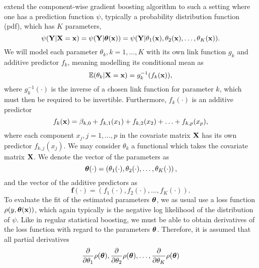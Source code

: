 \citet{schmid} extend the component-wise gradient boosting algorithm \citep{friedman2001} to such a setting where one has a prediction function $\psi$, typically a probability distribution function (pdf), which has $K$ parameters,
\begin{equation}
    \psi(\mathbf{Y}|\mathbf{X}=\mathbf{x})=\psi(\mathbf{Y}|\boldsymbol{\theta}(\mathbf{x}))=\psi(\mathbf{Y}|\theta_1(\mathbf{x}),\theta_2(\mathbf{x}),\ldots,\theta_K(\mathbf{x})).
\end{equation}
We will model each parameter $\theta_k,k=1,\ldots,K$ with its own link function $g_k$ and additive predictor $f_k$, meaning modelling its conditional mean as
\begin{equation}
    \mathbb{E}(\theta_k|\mathbf{X}=\mathbf{x})=g_k^{-1}(f_k(\mathbf{x})),
\end{equation}
where $g_k^{-1}(\cdot)$ is the inverse of a chosen link function for parameter $k$, which must then be required to be invertible. Furthermore, $f_k(\cdot)$ is an additive predictor
\begin{equation}
    f_k(\mathbf{x})=\beta_{k,0}+f_{k,1}(x_1)+f_{k,2}(x_2)+\ldots+f_{k,p}(x_p),
\end{equation}
where each component $x_j,j=1,\ldots,p$ in the covariate matrix $\mathbf{X}$ has its own predictor $f_{k,j}(x_j)$.
We may consider $\theta_k$ a functional which takes the covariate matrix $\mathbf{X}$. We denote the vector of the parameters as
\begin{equation}
    \boldsymbol{\theta}(\cdot)=\left(\theta_1(\cdot),\theta_2(\cdot),\ldots,\theta_K(\cdot)\right),
\end{equation}
and the vector of the additive predictors as
\begin{equation}
    \mathbf{f}(\cdot)=\left(f_1(\cdot),f_2(\cdot),\ldots,f_K(\cdot)\right).
\end{equation}
To evaluate the fit of the estimated parameters $\boldsymbol{\theta}$, we as usual use a loss function $\rho(y,\boldsymbol{\theta}(\mathbf{x}))$, which again typically is the negative log likelihood of the distribution of $\psi$. Like in regular statistical boosting, we must be able to obtain derivatives of the loss function with regard to the parameters $\boldsymbol{\theta}$. Therefore, it is assumed that all partial derivatives
\begin{equation}
    \frac{\partial}{\partial\theta_1}\rho(\boldsymbol{\theta}),\frac{\partial}{\partial\theta_2}\rho(\boldsymbol{\theta}),\ldots,\frac{\partial}{\partial\theta_K}\rho(\boldsymbol{\theta})
\end{equation}
